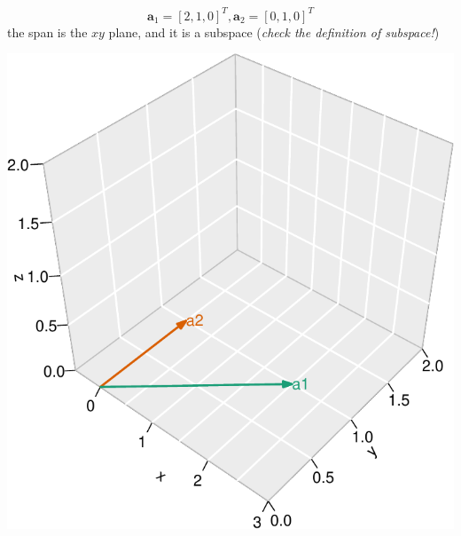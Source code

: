 \documentclass{scrartcl}
\newcommand{\vv}[1]{\boldsymbol{#1}}
\begin{document}
\begin{frame}{}
\protect\hypertarget{section-2}{}

\[\vv{a}_1 =[2,1,0]^T, \vv{a}_2=[0,1,0]^T\] the span is the \(xy\)
plane, and it is a subspace (\emph{check the definition of subspace!})

\begin{center}\includegraphics[width=0.5\linewidth]{math4ml_files/figure-beamer/unnamed-chunk-8-1} \end{center}

\end{frame}
\end{document}
